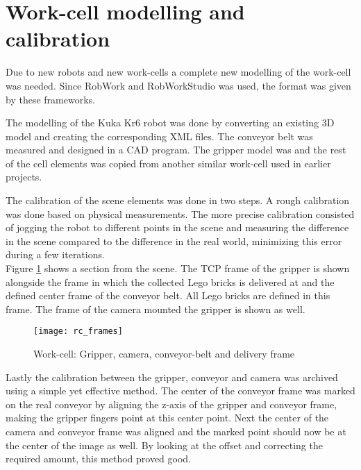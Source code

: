 \section{Work-cell modelling and calibration}
\label{sec:workcell}
Due to new robots and new work-cells a complete new modelling of the work-cell was needed. Since RobWork and RobWorkStudio was used, the format was given by these frameworks. 

The modelling of the Kuka Kr6 robot was done by converting an existing 3D model and creating the corresponding XML files. The conveyor belt was measured and designed in a CAD program. The gripper model was and the rest of the cell elements was copied from another similar work-cell used in earlier projects. 

The calibration of the scene elements was done in two steps. A rough calibration was done based on physical measurements. The more precise calibration consisted of jogging the robot to different points in the scene and measuring the difference in the scene compared to the difference in the real world, minimizing this error during a few iterations. \\

Figure \ref{fig:rc_frames} shows a section from the scene. The TCP frame of the gripper is shown alongside the frame in which the collected Lego bricks is delivered at and the defined center frame of the conveyor belt. All Lego bricks are defined in this frame. The frame of the camera mounted the gripper is shown as well. 

	\begin{figure}[H]
		\centering
	    \texttt{[image: rc\_frames]}
	    \caption{Work-cell: Gripper, camera, conveyor-belt and delivery frame}
		\label{fig:rc_frames}
	\end{figure}
	
Lastly the calibration between the gripper, conveyor and camera was archived using a simple yet effective method. The center of the conveyor frame was marked on the real conveyor by aligning the z-axis of the gripper and conveyor frame, making the gripper fingers point at this center point. Next the center of the camera and conveyor frame was aligned and the marked point should now be at the center of the image as well. By looking at the offset and correcting the required amount, this method proved good.  